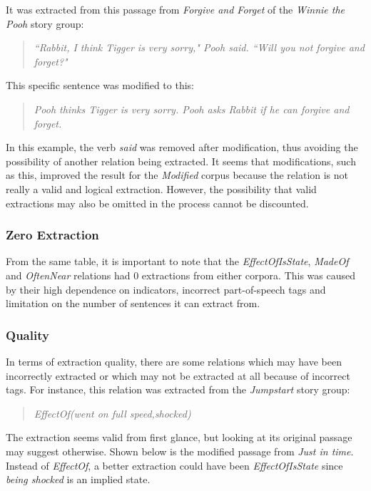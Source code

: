 It was extracted from this passage from \textit{Forgive and Forget} of the \textit{Winnie the Pooh} story group:

\begin{verse}
\itshape
``Rabbit, I think Tigger is very sorry," Pooh said. ``Will you not forgive and forget?"
\end{verse}

This specific sentence was modified to this:

\begin{verse}
\itshape
Pooh thinks Tigger is very sorry. Pooh asks Rabbit if he can forgive and forget.
\end{verse}

In this example, the verb \textit{said} was removed after modification, thus avoiding the possibility of another relation being extracted. It seems that modifications, such as this, improved the result for the \textit{Modified} corpus because the relation is not really a valid and logical extraction. However, the possibility that valid extractions may also be omitted in the process cannot be discounted.

\subsubsection{Zero Extraction}

From the same table, it is important to note that the \textit{EffectOfIsState}, \textit{MadeOf} and \textit{OftenNear} relations had 0 extractions from either corpora. This was caused by their high dependence on indicators, incorrect part-of-speech tags and limitation on the number of sentences it can extract from. 

\subsubsection{Quality}

In terms of extraction quality, there are some relations which may have been incorrectly extracted or which may not be extracted at all because of incorrect tags. For instance, this relation was extracted from the \textit{Jumpstart} story group:

\begin{verse}
\itshape
EffectOf(went on full speed,shocked)
\end{verse}

The extraction seems valid from first glance, but looking at its original passage may suggest otherwise. Shown below is the modified passage from \textit{Just in time}. Instead of \textit{EffectOf}, a better extraction could have been \textit{EffectOfIsState} since \textit{being shocked} is an implied state. 

